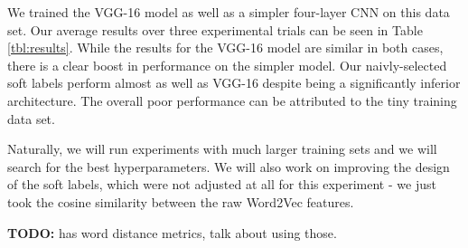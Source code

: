 We trained the VGG-16 model as well as a simpler four-layer CNN on this data
set. Our average results over three experimental trials can be seen in Table
\ref{tbl:results}.
While the results for the VGG-16 model are similar in both cases, there is a
clear boost in performance on the simpler model. Our naivly-selected soft
labels perform almost as well as VGG-16 despite being a significantly inferior
architecture.
The overall poor performance can be attributed to the tiny training data set.

Naturally, we will run experiments with much larger training sets and we will
search for the best hyperparameters.
We will also work on improving the design of the soft labels, which were not
adjusted at all for this experiment - we just took the cosine similarity
between the raw Word2Vec features.



\textbf{TODO:} \cite{budanitsky2006evaluating} has word distance metrics, talk
about using those.


%
